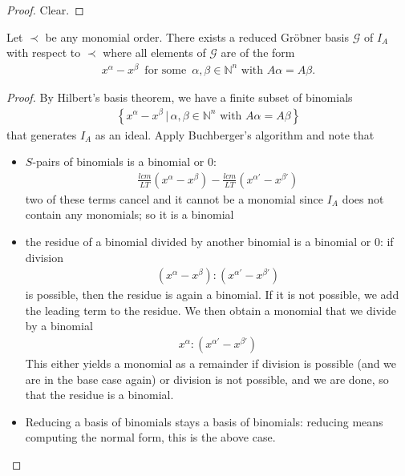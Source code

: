 \documentclass[a4paper, 11pt]{article}
\begin{document}
\begin{proof}
 Clear.
\end{proof}

\begin{cor}
  Let \( \prec \) be any monomial order. There exists a reduced Gröbner basis \( \mathcal{G} \) of \( I_A \) with respect to \( \prec \) where all elements of \( \mathcal{G} \) are of the form
  \begin{align*}
    x^\alpha - x^\beta \, \text{ for some } \, \alpha, \beta \in \mathbb N^n \text{ with } A\alpha = A\beta.
  \end{align*}
\end{cor}

\begin{proof}
  By Hilbert's basis theorem, we have a finite subset of binomials 
  \begin{align*}
    \left\{ 
    x^\alpha - x^\beta \, | \, \alpha, \beta \in \mathbb N^n \text{ with } A\alpha = A\beta
   \right\}
  \end{align*}
  that generates \( I_A \) as an ideal. Apply Buchberger's algorithm and note that 
  \begin{itemize}
    \item   \( S \)-pairs of binomials is a binomial or \( 0 \):
    \begin{align*}
      \frac{lcm}{LT}(x^\alpha - x^\beta) - \frac{lcm}{LT}(x^{\alpha'} - x^{\beta'})
    \end{align*}
    two of these terms cancel and it cannot be a monomial since \( I_A \) does not contain any monomials; so it is a binomial
    \item the residue of a binomial divided by another binomial is a binomial or \( 0 \): if division
    \begin{align*}
      (x^{\alpha} - x^{\beta}) :( x^{\alpha'} - x^{\beta'})
    \end{align*}
    is possible, then the residue is again a binomial. If it is not possible, we add the leading term to the residue. We then obtain a monomial that we divide by a binomial
    \begin{align*}
      x^\alpha : (x^{\alpha'} - x^{\beta '})
    \end{align*}
    This either yields a monomial as a remainder if division is possible (and we are in the base case again) or division is not possible, and we are done, so that the residue is a binomial.
    \item Reducing a basis of binomials stays a basis of binomials: reducing means computing the normal form, this is the above case.
  \end{itemize}
\end{proof}
\end{document}
